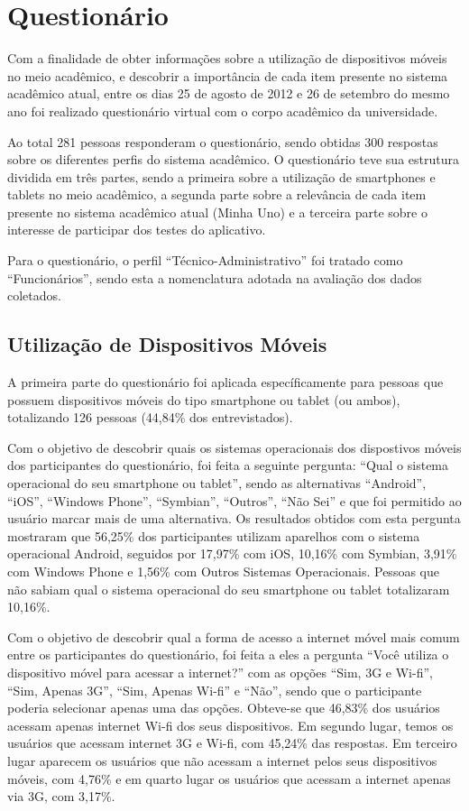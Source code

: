 \chapter{Questionário}
Com a finalidade de obter informações sobre a utilização de dispositivos móveis no meio acadêmico, e descobrir a importância de cada item presente no sistema acadêmico atual, entre os dias 25 de agosto de 2012 e 26 de setembro do mesmo ano foi realizado questionário virtual com o corpo acadêmico da universidade. 

Ao total 281 pessoas responderam o questionário, sendo obtidas 300 respostas sobre os diferentes perfis do sistema acadêmico. O questionário teve sua estrutura dividida em três partes, sendo a primeira sobre a utilização de smartphones e tablets no meio acadêmico, a segunda parte sobre a relevância de cada item presente no sistema acadêmico atual (Minha Uno) e a terceira parte sobre o interesse de participar dos testes do aplicativo.

Para o questionário, o perfil “Técnico-Administrativo'' foi tratado como “Funcionários'', sendo esta a nomenclatura adotada na avaliação dos dados coletados. 

\section{Utilização de Dispositivos Móveis}
A primeira parte do questionário foi aplicada específicamente para pessoas que possuem dispositivos móveis do tipo smartphone ou tablet (ou ambos), totalizando 126 pessoas (44,84\% dos entrevistados). 

Com o objetivo de descobrir quais os sistemas operacionais dos dispostivos móveis dos participantes do questionário, foi feita a seguinte pergunta: “Qual o sistema operacional do seu smartphone ou tablet'', sendo as alternativas “Android'', “iOS'', “Windows Phone'', “Symbian'', “Outros'', “Não Sei'' e que foi permitido ao usuário marcar mais de uma alternativa. Os resultados obtidos com esta pergunta mostraram que 56,25\% dos participantes utilizam aparelhos com o sistema operacional Android, seguidos por 17,97\% com iOS, 10,16\% com Symbian, 3,91\% com Windows Phone e 1,56\% com Outros Sistemas Operacionais. Pessoas que não sabiam qual o sistema operacional do seu smartphone ou tablet totalizaram 10,16\%.

Com o objetivo de descobrir qual a forma de acesso a internet móvel mais comum entre os participantes do questionário, foi feita a eles a pergunta “Você utiliza o dispositivo móvel para acessar a internet?'' com as opções “Sim, 3G e Wi-fi'', “Sim, Apenas 3G'', “Sim, Apenas Wi-fi'' e “Não'', sendo que o participante poderia selecionar apenas uma das opções. Obteve-se que 46,83\% dos usuários acessam apenas internet Wi-fi dos seus dispositivos. Em segundo lugar, temos os usuários que acessam internet 3G e Wi-fi, com 45,24\% das respostas. Em terceiro lugar aparecem os usuários que não acessam a internet pelos seus dispositivos móveis, com 4,76\% e em quarto lugar os usuários que acessam a internet apenas via 3G, com 3,17\%.

